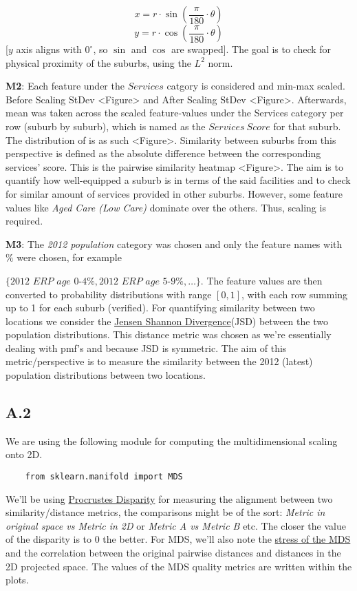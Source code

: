 \documentclass[
	a4paper, %
	10pt, %
	unnumberedsections, %
	twoside, %
]{LTJournalArticle}
\begin{document}
\[
x = r \cdot \sin\left(\frac{\pi}{180} \cdot \theta\right)
\]
\[
y = r \cdot \cos\left(\frac{\pi}{180} \cdot \theta\right)
\] [$y$ axis aligns with $0^\circ$, so $\sin$ and $\cos$ are swapped]. The goal is to check for physical proximity of the suburbs, using the $L^2$ norm.

\textbf{M2}: Each feature under the $Services$ catgory is considered and min-max scaled. Before Scaling StDev <Figure> and After Scaling StDev <Figure>. Afterwards, mean was taken across the scaled feature-values under the Services category per row (suburb by suburb), which is named as the $Services \ Score$ for that suburb. The distribution of is as such <Figure>. Similarity between suburbs from this perspective is defined as the absolute difference between the corresponding services' score. This is the pairwise similarity heatmap <Figure>. The aim is to quantify how well-equipped a suburb is in terms of the said facilities and to check for similar amount of services provided in other suburbs. However, some feature values like \textit{Aged Care (Low Care)} dominate over the others. Thus, scaling is required. 

\textbf{M3}: The \textit{2012 population} category was chosen and only the feature names with $\%$ were chosen, for example

$\{ \textit{2012 ERP age 0-4\%}, \textit{2012 ERP age 5-9\%}, \dots\}$. The feature values are then converted to probability distributions with range $[0,1]$, with each row summing up to 1 for each suburb (verified). For quantifying similarity between two locations we consider the \href{https://en.wikipedia.org/wiki/Jensen%E2%80%93Shannon_divergence}{Jensen Shannon Divergence}(JSD) between the two population distributions. This distance metric was chosen as we're essentially dealing with pmf's and because JSD is symmetric. The aim of this metric/perspective is to measure the similarity between the 2012 (latest) population distributions between two locations.



\subsection{A.2}

We are using the following module for computing the multidimensional scaling onto 2D.
\begin{verbatim}
    from sklearn.manifold import MDS
\end{verbatim}

We'll be using \href{https://en.wikipedia.org/wiki/Procrustes_analysis}{Procrustes Disparity} for measuring the alignment between two similarity/distance metrics, the comparisons might be of the sort: \textit{Metric in original space vs Metric in 2D} or \textit{Metric A vs Metric B} etc. The closer the value of the disparity is to 0 the better. For MDS, we'll also note the \href{https://imaging.mrc-cbu.cam.ac.uk/statswiki/FAQ/mds/stress#:~:text=The%20measure%20of%20goodness%20of,or%20more%20estimated%20stimuli%20dimensions}{stress of the MDS} and the correlation between the original pairwise distances and distances in the 2D projected space. The values of the MDS quality metrics are written within the plots.
\end{document}
